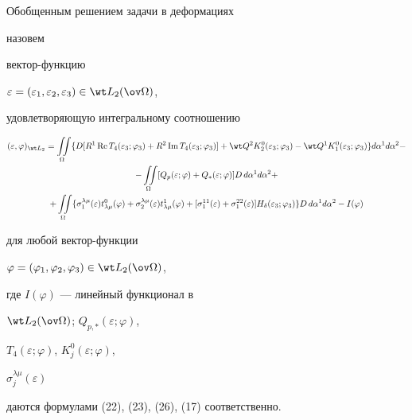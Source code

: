 \begin{defnnonum} Обобщенным решением задачи в деформациях 


назовем 


вектор-функцию 


$\varepsilon=(\varepsilon_1,\varepsilon_2,\varepsilon_3)\in\wt L_2


(\ov\Omega)$, 


удовлетворяющую интегральному соотношению 


\begin{multline} 


(\varepsilon,\varphi)_{\wt L_2}=\iint\limits_\Omega 


\{D[R^1\re T_4(\varepsilon_3;\varphi_3)+R^2\im T_4 


(\varepsilon_3;\varphi_3)]+\wt Q^2 K^0_2 


(\varepsilon_3;\varphi_3)-\wt Q^1 K^0_1(\varepsilon_3;\varphi_3)\} 


d\alpha^1d\alpha^2 - \\ 


-\iint\limits_\Omega[Q_p(\varepsilon;\varphi)+ 


Q_*(\varepsilon;\varphi)]D\,d\alpha^1 d\alpha^2 + \\ 


+\iint\limits_\Omega\{\sigma^{\lambda\mu}_1(\varepsilon) 


t^0_{\lambda\mu}(\varphi)+\sigma^{\lambda\mu}_2(\varepsilon) 


t^1_{\lambda\mu}(\varphi)+[\sigma^{11}_1(\varepsilon)+ 


\sigma^{22}_1(\varepsilon)]H_\delta(\varepsilon_3;\varphi_3)\} 


D\,d\alpha^1d\alpha^2-I(\varphi) 


\end{multline} 


для любой вектор-функции 


$\varphi=(\varphi_1,\varphi_2,\varphi_3)\in\wt L_2(\ov\Omega)$, 


где $I(\varphi)$ --- линейный функционал в 


$\wt L_2(\ov\Omega)$; $Q_{p,*}(\varepsilon;\varphi)$, 


$T_4(\varepsilon;\varphi)$, $K^0_j(\varepsilon;\varphi)$, 


$\sigma^{\lambda\mu}_j(\varepsilon)$ 


даются формулами (22), (23), (26), (17) соответственно. 


\end{defnnonum} 


